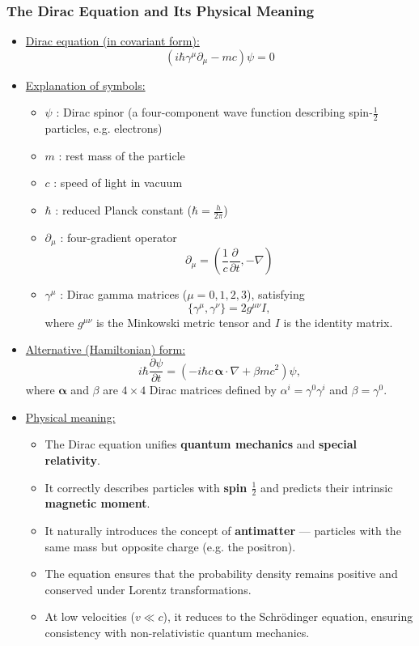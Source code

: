 \documentclass[t,aspectratio=169]{beamer}
\begin{document}
\begin{frame}
\frametitle{The Dirac Equation and Its Physical Meaning}
\begin{itemize}
\setlength{\parskip}{3pt}
\setlength{\itemsep}{3pt}

\item \underline{Dirac equation (in covariant form):}
$$\left( i \hbar \gamma^{\mu} \partial_{\mu} - m c \right) \psi = 0$$

\item \underline{Explanation of symbols:}
\begin{itemize}
\item $\psi$ : Dirac spinor (a four-component wave function describing spin-$\tfrac{1}{2}$ particles, e.g. electrons)
\item $m$ : rest mass of the particle
\item $c$ : speed of light in vacuum
\item $\hbar$ : reduced Planck constant ($\hbar = \frac{h}{2\pi}$)
\item $\partial_{\mu}$ : four-gradient operator  
      $$\partial_{\mu} = \left( \frac{1}{c}\frac{\partial}{\partial t}, -\nabla \right)$$
\item $\gamma^{\mu}$ : Dirac gamma matrices ($\mu = 0,1,2,3$), satisfying  
      $$  \{ \gamma^{\mu}, \gamma^{\nu} \} = 2 g^{\mu\nu} I, $$
      where $g^{\mu\nu}$ is the Minkowski metric tensor and $I$ is the identity matrix.
\end{itemize}

\item \underline{Alternative (Hamiltonian) form:}
$$ i \hbar \frac{\partial \psi}{\partial t} = \left( -i \hbar c\, \boldsymbol{\alpha} \cdot \nabla + \beta m c^{2} \right) \psi, $$
where $\boldsymbol{\alpha}$ and $\beta$ are $4\times4$ Dirac matrices defined by  
$\alpha^{i} = \gamma^{0}\gamma^{i}$ and $\beta = \gamma^{0}$.

\pagebreak

\item \underline{Physical meaning:}
\begin{itemize}
\item The Dirac equation unifies \textbf{quantum mechanics} and \textbf{special relativity}.
\item It correctly describes particles with \textbf{spin $\tfrac{1}{2}$} and predicts their intrinsic \textbf{magnetic moment}.
\item It naturally introduces the concept of \textbf{antimatter} — particles with the same mass but opposite charge (e.g. the positron).
\item The equation ensures that the probability density remains positive and conserved under Lorentz transformations.
\item At low velocities ($v \ll c$), it reduces to the Schrödinger equation, ensuring consistency with non-relativistic quantum mechanics.
\end{itemize}

\end{itemize}
\end{frame}
\end{document}
